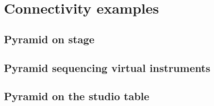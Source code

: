 \section{Connectivity examples}

\subsection{Pyramid on stage}


\subsection{Pyramid sequencing virtual instruments}


\subsection{Pyramid on the studio table}


